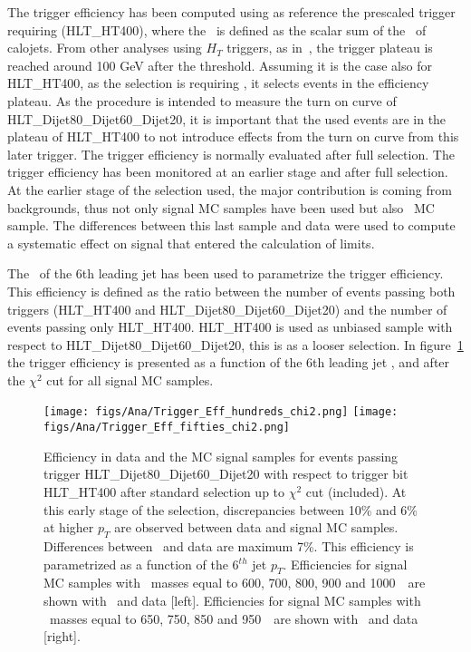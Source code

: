 The trigger efficiency has been computed using as reference the prescaled trigger requiring  (HLT\_HT400), where the \HT~is defined as the scalar sum of the \pt~of calojets. From other analyses using $H_{T}$ triggers, as in~\cite{Khachatryan:2015axa}, the trigger plateau is reached around 100 GeV after the threshold. Assuming it is the case also for HLT\_HT400, as the selection is requiring , it selects events in the efficiency plateau. As the procedure is intended to measure the turn on curve of HLT\_Dijet80\_Dijet60\_Dijet20, it is important that the used events are in the plateau of HLT\_HT400 to not introduce effects from the turn on curve from this later trigger. The trigger efficiency is normally evaluated after full selection. The trigger efficiency has been monitored at an earlier stage and after full selection. At the earlier stage of the selection used, the major contribution is coming from backgrounds, thus not only signal MC samples have been used but also \ttbar~MC sample. The differences between this last sample and data were used to compute a systematic effect on signal that entered the calculation of limits.

The \pt~of the 6th leading jet has been used to parametrize the trigger efficiency. This efficiency is defined as the ratio between the number of events passing both triggers (HLT\_HT400 and HLT\_Dijet80\_Dijet60\_Dijet20) and the number of events passing only HLT\_HT400. HLT\_HT400 is used as unbiased sample with respect to HLT\_Dijet80\_Dijet60\_Dijet20, this is as a looser selection. In figure~\ref{fig:TrigEff} the trigger efficiency is presented as a function of the 6th leading jet \pt, and after the $\chi^{2}$ cut for all signal MC samples. 

\begin{figure}[!Hhtbp]
  \begin{center}
    \texttt{[image: figs/Ana/Trigger\_Eff\_hundreds\_chi2.png]}
    \texttt{[image: figs/Ana/Trigger\_Eff\_fifties\_chi2.png]}
    \caption{Efficiency in data and the MC signal samples for events passing trigger HLT\_Dijet80\_Dijet60\_Dijet20 with respect to trigger bit HLT\_HT400 after standard selection up to $\chi^{2}$ cut (included). At this early stage of the selection, discrepancies between 10\% and 6\% at higher $p_{T}$ are observed between data and signal MC samples. Differences between \ttbar~and data are maximum 7\%. This efficiency is parametrized as a function of the 6$^{th}$ jet $p_{T}$. Efficiencies for signal MC samples with \Tp~masses equal to 600, 700, 800, 900 and 1000~\GeVcc~are shown with \ttbar~and data [left]. Efficiencies for signal MC samples with \Tp~masses equal to 650, 750, 850 and 950~\GeVcc~are shown with \ttbar~and data [right].}
    \label{fig:TrigEff}
  \end{center}
\end{figure}

